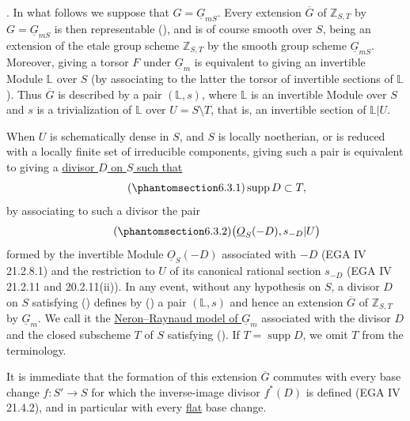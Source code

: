 
\medskip
\noindent {}.  In what follows we suppose that
$G=\underline G_{mS}$.  Every extension $\overline G$ of
$\mathbb Z_{S,T}$ by $G=\underline G_{mS}$ is then representable (),
and is of course smooth over $S$, being an extension of the etale group
scheme $\mathbb Z_{S,T}$ by the smooth group scheme $\underline G_{mS}$.
Moreover, giving a torsor $F$ under $\underline G_m$ is equivalent to giving
an invertible Module $\mathbb L$ over $S$ (by associating to the latter the
torsor of invertible sections of $\mathbb L$).  Thus $\overline G$ is
described by a pair $(\mathbb L,s)$, where $\mathbb L$ is an invertible
Module over $S$ and $s$ is a trivialization of $\mathbb L$ over
$U=S\setminus T$, that is, an invertible section of $\mathbb L|U$.

When $U$ is schematically dense in $S$, and $S$ is locally noetherian, or is
reduced with a locally finite set of irreducible components, giving such a
pair is equivalent to giving a \underline{divisor $D$ on $S$ such that}
\begin{equation}\tag{\SGARefTarget{sga7.sga7i.eviii.n6-3-1}{6.3.1}}
 \operatorname{supp}D\subset T,
\end{equation}
by associating to such a divisor the pair
\begin{equation}\tag{\SGARefTarget{sga7.sga7i.eviii.n6-3-2}{6.3.2}}
 \bigl(\underline O_S(-D),s_{-D}|U\bigr)
\end{equation}
formed by the invertible Module $\underline O_S(-D)$ associated with $-D$
(EGA IV 21.2.8.1) and the restriction to $U$ of its canonical rational
section $s_{-D}$ (EGA IV 21.2.11 and 20.2.11(ii)).  In any event, without
any hypothesis on $S$, a divisor $D$ on $S$ satisfying () defines by
() a pair $(\mathbb L,s)$ and hence an extension $\overline G$ of
$\mathbb Z_{S,T}$ by $\underline G_m$.  We call it the
\underline{Neron--Raynaud model of $\underline G_m$} associated with the
divisor $D$ and the closed subscheme $T$ of $S$ satisfying ().  If
$T=\operatorname{supp}D$, we omit $T$ from the terminology.

It is immediate that the formation of this extension $\overline G$ commutes
with every base change $f:S'\to S$ for which the inverse-image divisor
$f^*(D)$ is defined (EGA IV 21.4.2), and in particular with every
\underline{flat} base change.

